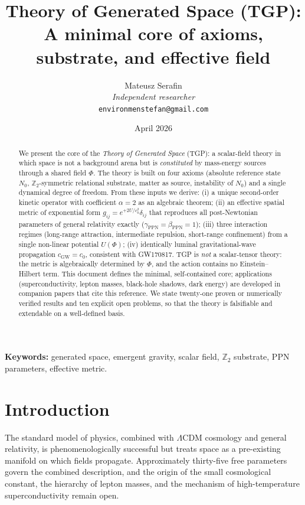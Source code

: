 \documentclass[11pt,a4paper]{article}
\title{%
  \textbf{Theory of Generated Space (TGP):}\\[4pt]
  \large A minimal core of axioms, substrate, and effective field%
}
\author{Mateusz Serafin\\[2pt]
\small\textit{Independent researcher}\\[-2pt]
\small\texttt{environmenstefan@gmail.com}}
\date{April 2026}
\renewcommand{\Phi}{\varPhi}
\newcommand{\Nzero}{N_{0}}
\newcommand{\Zp}{\mathbb{Z}_{2}}
\begin{document}
\maketitle

\begin{abstract}
We present the core of the \emph{Theory of Generated Space} (TGP):
a scalar-field theory in which space is not a background arena but is
\emph{constituted} by mass-energy sources through a shared field $\Phi$.
The theory is built on four axioms
(absolute reference state $\Nzero$, $\Zp$-symmetric relational substrate,
matter as source, instability of $\Nzero$) and a single dynamical degree of freedom.
From these inputs we derive:
(i) a unique second-order kinetic operator with coefficient $\alpha=2$ as an
algebraic theorem;
(ii) an effective spatial metric of exponential form $g_{ij}=e^{+2U/c_{0}^{2}}\delta_{ij}$
that reproduces all post-Newtonian parameters of general relativity exactly
($\gamma_{\mathrm{PPN}}=\beta_{\mathrm{PPN}}=1$);
(iii) three interaction regimes (long-range attraction, intermediate repulsion,
short-range confinement) from a single non-linear potential $U(\Phi)$;
(iv) identically luminal gravitational-wave propagation
$c_{\mathrm{GW}}=c_{0}$, consistent with GW170817.
TGP is \emph{not} a scalar-tensor theory: the metric is algebraically determined
by $\Phi$, and the action contains no Einstein--Hilbert term.
This document defines the minimal, self-contained core; applications
(superconductivity, lepton masses, black-hole shadows, dark energy) are
developed in companion papers that cite this reference.
We state twenty-one proven or numerically verified results and ten
explicit open problems, so that the theory is falsifiable and extendable
on a well-defined basis.
\end{abstract}

\noindent\textbf{Keywords:}
generated space, emergent gravity, scalar field, $\Zp$ substrate,
PPN parameters, effective metric.

\tableofcontents
\newpage

\section{Introduction}\label{sec:intro}

The standard model of physics, combined with $\Lambda$CDM cosmology and
general relativity, is phenomenologically successful but treats space as
a pre-existing manifold on which fields propagate. Approximately thirty-five
free parameters govern the combined description, and the origin of the
small cosmological constant, the hierarchy of lepton masses, and the
mechanism of high-temperature superconductivity remain open.
\end{document}
